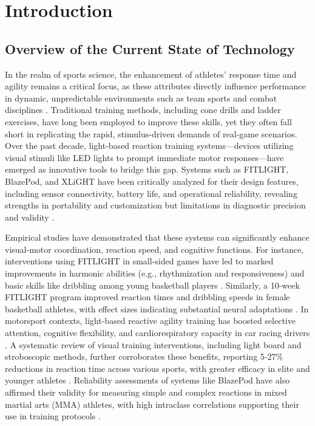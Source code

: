 \chapter{Introduction}
\label{sec:researchdesc}    %

\section{Overview of the Current State of Technology}
\label{sec:overview}

In the realm of sports science, the enhancement of athletes' response time and agility remains a critical focus, as these attributes directly influence performance in dynamic, unpredictable environments such as team sports and combat disciplines \cite{Hassan:2023:ESF}. Traditional training methods, including cone drills and ladder exercises, have long been employed to improve these skills, yet they often fall short in replicating the rapid, stimulus-driven demands of real-game scenarios. Over the past decade, light-based reaction training systems—devices utilizing visual stimuli like LED lights to prompt immediate motor responses—have emerged as innovative tools to bridge this gap. Systems such as FITLIGHT, BlazePod, and XLiGHT have been critically analyzed for their design features, including sensor connectivity, battery life, and operational reliability, revealing strengths in portability and customization but limitations in diagnostic precision and validity \cite{Ezhov:2021:MLS}.

Empirical studies have demonstrated that these systems can significantly enhance visual-motor coordination, reaction speed, and cognitive functions. For instance, interventions using FITLIGHT in small-sided games have led to marked improvements in harmonic abilities (e.g., rhythmization and responsiveness) and basic skills like dribbling among young basketball players \cite{Hassan:2023:ESF}. Similarly, a 10-week FITLIGHT program improved reaction times and dribbling speeds in female basketball athletes, with effect sizes indicating substantial neural adaptations \cite{Hassan:2025:FTI}. In motorsport contexts, light-based reactive agility training has boosted selective attention, cognitive flexibility, and cardiorespiratory capacity in car racing drivers \cite{Horvath:2022:ARA}. A systematic review of visual training interventions, including light board and stroboscopic methods, further corroborates these benefits, reporting 5-27\% reductions in reaction time across various sports, with greater efficacy in elite and younger athletes \cite{Jothi:2025:EVT}. Reliability assessments of systems like BlazePod have also affirmed their validity for measuring simple and complex reactions in mixed martial arts (MMA) athletes, with high intraclass correlations supporting their use in training protocols \cite{Polechonski:2024:RVR}.

